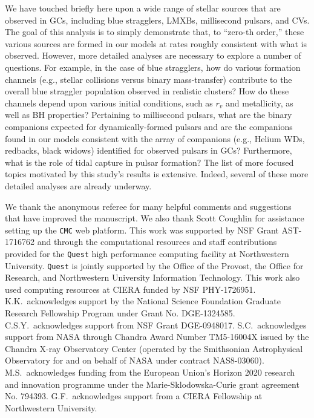 \documentclass[twocolumn,tighten]{aastex63}
\begin{document}
We have touched briefly here upon a wide range of stellar sources that are observed in GCs, including blue stragglers, LMXBs, millisecond pulsars, and CVs. The goal of this analysis is to simply demonstrate that, to ``zero-th order,'' these various sources are formed in our models at rates roughly consistent with what is observed. However, more detailed analyses are necessary to explore a number of questions. For example, in the case of blue stragglers, how do various formation channels (e.g., stellar collisions versus binary mass-transfer) contribute to the overall blue straggler population observed in realistic clusters? How do these channels depend upon various initial conditions, such as $r_v$ and metallicity, as well as BH properties? Pertaining to millisecond pulsars, what are the binary companions expected for dynamically-formed pulsars and are the companions found in our models consistent with the array of companions (e.g., Helium WDs, redbacks, black widows) identified for observed pulsars in GCs? Furthermore, what is the role of tidal capture in pulsar formation? The list of more focused topics motivated by this study's results is extensive. Indeed, several of these more detailed analyses are already underway.

\acknowledgments
We thank the anonymous referee for many helpful comments and suggestions that have improved the manuscript. We also thank Scott Coughlin for assistance setting up the \texttt{CMC} web platform. This work was supported by NSF Grant AST-1716762 and through the computational resources and staff contributions provided for the {\tt Quest} high performance computing facility at Northwestern University. {\tt Quest} is jointly supported by the Office of the Provost, the Office for Research, and Northwestern University Information Technology.
This work also used computing resources at CIERA funded by NSF PHY-1726951.
K.K.\ acknowledges support by the National Science Foundation Graduate Research Fellowship Program under Grant No. DGE-1324585.
C.S.Y.\ acknowledges support from NSF Grant DGE-0948017.
S.C.\ acknowledges support from NASA through Chandra Award Number TM5-16004X issued by the Chandra X-ray Observatory Center
(operated by the Smithsonian Astrophysical Observatory for and on behalf of NASA under contract NAS8-03060). 
M.S.\ acknowledges funding from the European Union's Horizon 2020 research and innovation programme under the Marie-Sklodowska-Curie grant agreement No. 794393.
G.F.\ acknowledges support from a CIERA Fellowship at Northwestern University.
\end{document}
